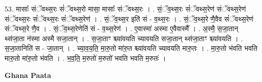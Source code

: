\documentclass[17pt]{extarticle}
\begin{document}
53. मासाः᳚ संॅवथ्स॒रः सं॑ॅवथ्स॒रो मासा॒ मासाः᳚ संॅवथ्स॒रः । . सं॒ॅव॒थ्स॒रः सं॑ॅवथ्स॒रेण॑ संॅवथ्स॒रेण॑ संॅवथ्स॒रः सं॑ॅवथ्स॒रः सं॑ॅवथ्स॒रेण॑ । . सं॒ॅव॒थ्स॒र इति॑ सं - व॒थ्स॒रः । . सं॒ॅव॒थ्स॒रे णै॒वैव सं॑ॅवथ्स॒रेण॑ संॅवथ्स॒रे णै॒व । . सं॒ॅव॒थ्स॒रेणेति॑ सं - व॒थ्स॒रेण॑ । . ए॒वास्मा॑ अस्मा ए॒वैवास्मै᳚ । . अ॒स्मै॒ स॒जा॒तान् थ्स॑जा॒ता न॑स्मा अस्मै सजा॒तान् । . स॒जा॒ताꣳ श्च्या॑वयति च्यावयति सजा॒तान् थ्स॑जा॒ताꣳ श्च्या॑वयति । . स॒जा॒तानिति॑ स - जा॒तान् । . च्या॒व॒य॒ति॒ मा॒रु॒तो मा॑रु॒त श्च्या॑वयति च्यावयति मारु॒तः । . मा॒रु॒तो भ॑वति भवति मारु॒तो मा॑रु॒तो भ॑वति । . भ॒व॒ति॒ म॒रुतो॑ म॒रुतो॑ भवति भवति म॒रुतः॑ । \newline

\textbf{Ghana Paata } \newline
\end{document}
